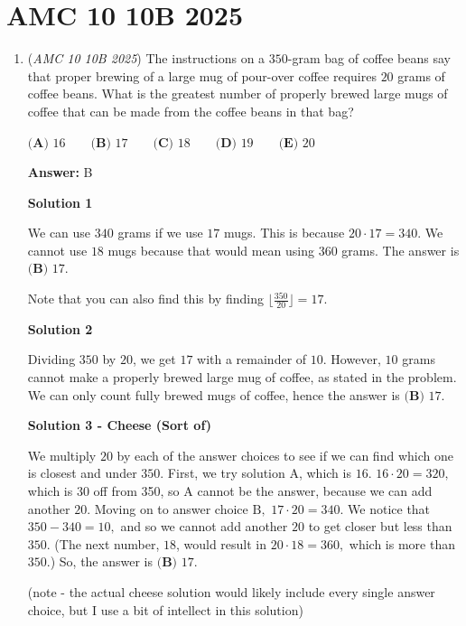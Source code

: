 \section{AMC 10 10B 2025}
        \begin{enumerate}
        	\item (\textit{AMC 10 10B 2025}) The instructions on a $350$-gram bag of coffee beans say that proper brewing of a large mug of pour-over coffee requires $20$ grams of coffee beans. What is the greatest number of properly brewed large mugs of coffee that can be made from the coffee beans in that bag?


 $\textbf{(A) } 16 \qquad\textbf{(B) } 17 \qquad\textbf{(C) } 18 \qquad\textbf{(D) } 19 \qquad\textbf{(E) } 20$

 \textbf{Answer: }B



\textbf{Solution 1}

We can use $340$ grams if we use $17$ mugs. This is because $20 \cdot 17 = 340$. We cannot use $18$ mugs because that would mean using $360$ grams. The answer is $\boxed{\textbf{(B) } 17}$.

 Note that you can also find this by finding $\lfloor \frac{350}{20} \rfloor = 17.$




\textbf{Solution 2}

Dividing $350$ by $20$, we get $17$ with a remainder of $10$. However, $10$ grams cannot make a properly brewed large mug of coffee, as stated in the problem. We can only count fully brewed mugs of coffee, hence the answer is $\boxed{\textbf{(B) } 17}$.

 



\textbf{Solution 3 - Cheese (Sort of)}

We multiply $20$ by each of the answer choices to see if we can find which one is closest and under $350.$ First, we try solution $\text{A}$, which is $16$. $16 \cdot 20 = 320,$ which is $30$ off from 350, so $\text{A}$ cannot be the answer, because we can add another $20$. Moving on to answer choice $\text{B},$ $17 \cdot 20 = 340.$ We notice that $350-340=10,$ and so we cannot add another $20$ to get closer but less than $350.$ (The next number, $18$, would result in $20 \cdot 18=360,$ which is more than $350$.) So, the answer is $\boxed{\textbf{(B) } 17}$.

 (note - the actual cheese solution would likely include every single answer choice, but I use a bit of intellect in this solution)


\end{enumerate}
